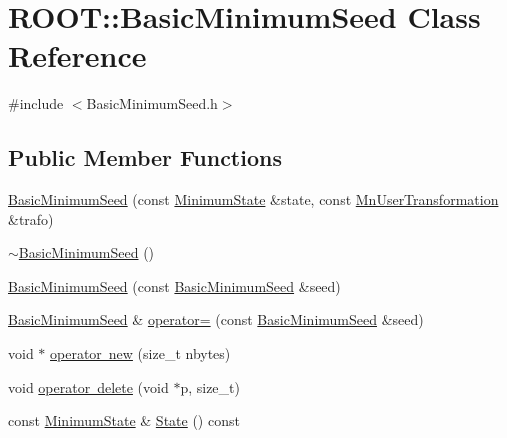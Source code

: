 \hypertarget{classROOT_1_1Minuit2_1_1BasicMinimumSeed}{}\section{R\+O\+OT\+:\+:Basic\+Minimum\+Seed Class Reference}
\label{classROOT_1_1Minuit2_1_1BasicMinimumSeed}


{\ttfamily \#include $<$Basic\+Minimum\+Seed.\+h$>$}

\subsection*{Public Member Functions}
\begin{DoxyCompactItemize}
\item 
\mbox{\hyperlink{classROOT_1_1Minuit2_1_1BasicMinimumSeed_aae0d1c36a05bf57a221d1930a9ffbb87}{Basic\+Minimum\+Seed}} (const \mbox{\hyperlink{classROOT_1_1Minuit2_1_1MinimumState}{Minimum\+State}} \&state, const \mbox{\hyperlink{classROOT_1_1Minuit2_1_1MnUserTransformation}{Mn\+User\+Transformation}} \&trafo)
\item 
\mbox{\hyperlink{classROOT_1_1Minuit2_1_1BasicMinimumSeed_ab0106865fff141f6f402cc934ea292d7}{$\sim$\+Basic\+Minimum\+Seed}} ()
\item 
\mbox{\hyperlink{classROOT_1_1Minuit2_1_1BasicMinimumSeed_a9bd68bcfd30880f67566bfd4f70a2ca6}{Basic\+Minimum\+Seed}} (const \mbox{\hyperlink{classROOT_1_1Minuit2_1_1BasicMinimumSeed}{Basic\+Minimum\+Seed}} \&seed)
\item 
\mbox{\hyperlink{classROOT_1_1Minuit2_1_1BasicMinimumSeed}{Basic\+Minimum\+Seed}} \& \mbox{\hyperlink{classROOT_1_1Minuit2_1_1BasicMinimumSeed_aeffefca123cbfd95d19fa7fb7e087431}{operator=}} (const \mbox{\hyperlink{classROOT_1_1Minuit2_1_1BasicMinimumSeed}{Basic\+Minimum\+Seed}} \&seed)
\item 
void $\ast$ \mbox{\hyperlink{classROOT_1_1Minuit2_1_1BasicMinimumSeed_ae9ee17ec0140aa209e488b064675f3c3}{operator new}} (size\+\_\+t nbytes)
\item 
void \mbox{\hyperlink{classROOT_1_1Minuit2_1_1BasicMinimumSeed_ae2af98f9f03cfe5e5202153b914ff120}{operator delete}} (void $\ast$p, size\+\_\+t)
\item 
const \mbox{\hyperlink{classROOT_1_1Minuit2_1_1MinimumState}{Minimum\+State}} \& \mbox{\hyperlink{classROOT_1_1Minuit2_1_1BasicMinimumSeed_a92e671b9a963d83076238c2e2b283e7c}{State}} () const
\item 

\end{DoxyCompactItemize}

